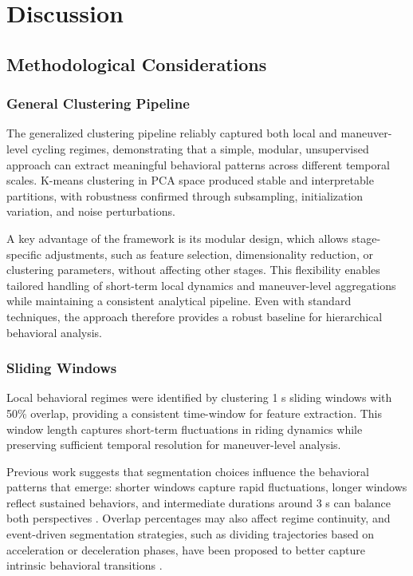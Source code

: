 \chapter{Discussion}


\section{Methodological Considerations}

\subsection{General Clustering Pipeline}

The generalized clustering pipeline reliably captured both local and maneuver-level cycling regimes, demonstrating that a simple, modular, unsupervised approach can extract meaningful behavioral patterns across different temporal scales. K-means clustering in PCA space produced stable and interpretable partitions, with robustness confirmed through subsampling, initialization variation, and noise perturbations.

A key advantage of the framework is its modular design, which allows stage-specific adjustments, such as feature selection, dimensionality reduction, or clustering parameters, without affecting other stages. This flexibility enables tailored handling of short-term local dynamics and maneuver-level aggregations while maintaining a consistent analytical pipeline. Even with standard techniques, the approach therefore provides a robust baseline for hierarchical behavioral analysis.

\subsection{Sliding Windows}

Local behavioral regimes were identified by clustering 1 s sliding windows with 50\% overlap, providing a consistent time-window for feature extraction. This window length captures short-term fluctuations in riding dynamics while preserving sufficient temporal resolution for maneuver-level analysis.

Previous work suggests that segmentation choices influence the behavioral patterns that emerge: shorter windows capture rapid fluctuations, longer windows reflect sustained behaviors, and intermediate durations around 3 s can balance both perspectives \cite{li_volatility-based_2025}. Overlap percentages may also affect regime continuity, and event-driven segmentation strategies, such as dividing trajectories based on acceleration or deceleration phases, have been proposed to better capture intrinsic behavioral transitions \cite{yarlagadda_exploring_2022}.

